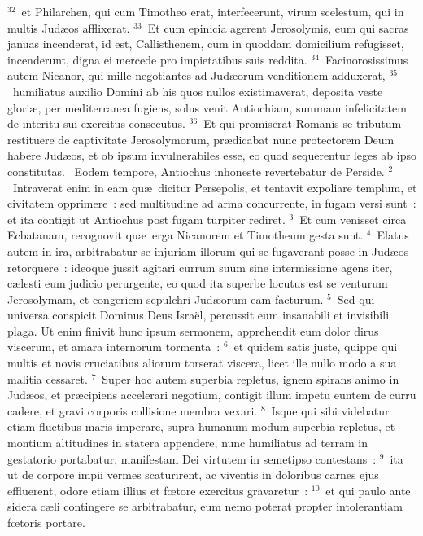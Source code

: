 ${}^{32}$~et Philarchen, qui cum Timotheo erat, interfecerunt, virum scelestum, qui in multis Jud\ae os afflixerat.
${}^{33}$~Et cum epinicia agerent Jerosolymis, eum qui sacras januas incenderat, id est, Callisthenem, cum in quoddam domicilium refugisset, incenderunt, digna ei mercede pro impietatibus suis reddita.
${}^{34}$~Facinorosissimus autem Nicanor, qui mille negotiantes ad Jud\ae orum venditionem adduxerat,
${}^{35}$~humiliatus auxilio Domini ab his quos nullos existimaverat, deposita veste glori\ae , per mediterranea fugiens, solus venit Antiochiam, summam infelicitatem de interitu sui exercitus consecutus.
${}^{36}$~Et qui promiserat Romanis se tributum restituere de captivitate Jerosolymorum, pr\ae dicabat nunc protectorem Deum habere Jud\ae os, et ob ipsum invulnerabiles esse, eo quod sequerentur leges ab ipso constitutas.
~Eodem tempore, Antiochus inhoneste revertebatur de Perside.
${}^{2}$~Intraverat enim in eam qu\ae\ dicitur Persepolis, et tentavit expoliare templum, et civitatem opprimere~: sed multitudine ad arma concurrente, in fugam versi sunt~: et ita contigit ut Antiochus post fugam turpiter rediret.
${}^{3}$~Et cum venisset circa Ecbatanam, recognovit qu\ae\ erga Nicanorem et Timotheum gesta sunt.
${}^{4}$~Elatus autem in ira, arbitrabatur se injuriam illorum qui se fugaverant posse in Jud\ae os retorquere~: ideoque jussit agitari currum suum sine intermissione agens iter, c\ae lesti eum judicio perurgente, eo quod ita superbe locutus est se venturum Jerosolymam, et congeriem sepulchri Jud\ae orum eam facturum.
${}^{5}$~Sed qui universa conspicit Dominus Deus Isra\"el, percussit eum insanabili et invisibili plaga. Ut enim finivit hunc ipsum sermonem, apprehendit eum dolor dirus viscerum, et amara internorum tormenta~:
${}^{6}$~et quidem satis juste, quippe qui multis et novis cruciatibus aliorum torserat viscera, licet ille nullo modo a sua malitia cessaret.
${}^{7}$~Super hoc autem superbia repletus, ignem spirans animo in Jud\ae os, et pr\ae cipiens accelerari negotium, contigit illum impetu euntem de curru cadere, et gravi corporis collisione membra vexari.
${}^{8}$~Isque qui sibi videbatur etiam fluctibus maris imperare, supra humanum modum superbia repletus, et montium altitudines in statera appendere, nunc humiliatus ad terram in gestatorio portabatur, manifestam Dei virtutem in semetipso contestans~:
${}^{9}$~ita ut de corpore impii vermes scaturirent, ac viventis in doloribus carnes ejus effluerent, odore etiam illius et fœtore exercitus gravaretur~:
${}^{10}$~et qui paulo ante sidera c\ae li contingere se arbitrabatur, eum nemo poterat propter intolerantiam fœtoris portare.


